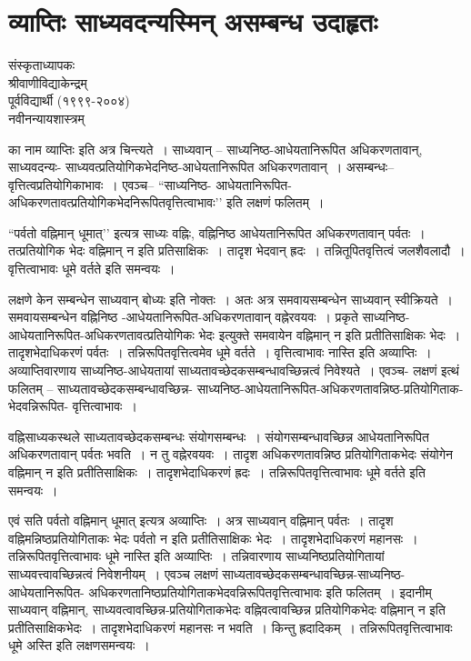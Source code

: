 {\fontsize{15}{17}\selectfont
\chapter{व्याप्तिः साध्यवदन्यस्मिन्  असम्बन्ध उदाहृतः}

\begin{center}
\smallskip

संस्कृताध्यापकः\\
श्रीवाणीविद्याकेन्द्रम्\\
पूर्वविद्यार्थी (१९९९-२००४)\\
नवीनन्यायशास्त्रम्
\addrule
\end{center}

का नाम व्याप्तिः इति अत्र चिन्त्यते~। साध्यवान् – साध्यनिष्ठ-आधेयतानिरूपित अधिकरणतावान्, साध्यवदन्यः- साध्यवत्प्रतियोगिकभेदनिष्ठ-आधेयतानिरूपित अधिकरणतावान्~। असम्बन्धः--वृत्तित्वप्रतियोगिकाभावः~। एवञ्च– “साध्यनिष्ठ- आधेयतानिरूपित-अधिकरणतावत्प्रतियोगिकभेदनिरूपितवृत्तित्वाभावः’’ इति लक्षणं फलितम्~। 

“पर्वतो वह्निमान् धूमात्’’ इत्यत्र साध्यः वह्निः, वह्निनिष्ठ आधेयतानिरूपित अधिकरणतावान् पर्वतः~। तत्प्रतियोगिक भेदः वह्निमान् न इति प्रतिसाक्षिकः~। तादृश भेदवान् ह्रदः~। तन्नितूपितवृत्तित्वं जलशैवलादौ~। वृत्तित्वाभावः धूमे वर्तते इति समन्वयः~। 

लक्षणे केन सम्बन्धेन साध्यवान् बोध्यः इति नोक्तः~। अतः अत्र समवायसम्बन्धेन साध्यवान् स्वीक्रियते~। समवायसम्बन्धेन वह्निनिष्ठ -आधेयतानिरूपित-अधिकरणतावान् वह्नेरवयवः~। प्रकृते साध्यनिष्ठ-आधेयतानिरूपित-अधिकरणतावत्प्रतियोगिकः भेदः इत्युक्ते समवायेन वह्निमान् न इति प्रतीतिसाक्षिकः भेदः~। तादृशभेदाधिकरणं पर्वतः~। तन्निरूपितवृत्तित्वमेव धूमे वर्तते~। वृत्तित्वाभावः नास्ति इति अव्याप्तिः~। अव्याप्तिवारणाय साध्यनिष्ठ-आधेयतायां साध्यतावच्छेदकसम्बन्धावच्छिन्नत्वं निवेश्यते~। एवञ्च- लक्षणं इत्थं फलितम् – साध्यतावच्छेदकसम्बन्धावच्छिन्न- साध्यनिष्ठ-आधेयतानिरूपित-अधिकरणतावन्निष्ठ-प्रतियोगिताक-भेदवन्निरूपित- वृत्तित्वाभावः~। 

वह्निसाध्यकस्थले साध्यतावच्छेदकसम्बन्धः संयोगसम्बन्धः~। संयोगसम्बन्धावच्छिन्न आधेयतानिरूपित अधिकरणतावान् पर्वतः भवति~। न तु वह्नेरवयवः~। तादृश अधिकरणतावन्निष्ठ प्रतियोगिताकभेदः संयोगेन वह्निमान् न इति प्रतीतिसाक्षिकः~। तादृशभेदाधिकरणं ह्रदः~। तन्निरूपितवृत्तित्वाभावः धूमे वर्तते इति समन्वयः~। 

एवं सति पर्वतो वह्निमान् धूमात् इत्यत्र अव्याप्तिः~। अत्र साध्यवान् वह्निमान् पर्वतः~। तादृश वह्निमन्निष्ठप्रतियोगिताकः भेदः पर्वतो न इति प्रतीतिसाक्षिकः भेदः~। तादृशभेदाधिकरणं महानसः~। तन्निरूपितवृत्तित्वाभावः धूमे नास्ति इति अव्याप्तिः~। तन्निवारणाय साध्यनिष्ठप्रतियोगितायां साध्यवत्त्वावच्छिन्नत्वं निवेशनीयम्~। एवञ्च लक्षणं साध्यतावच्छेदकसम्बन्धा\-वच्छिन्न-साध्यनिष्ठ-आधेयतानिरूपित- अधिकरणतानिष्ठप्रतियोगिताकभेदवन्निरूपितवृत्तित्वाभावः इति फलितम्~। इदानीम् साध्यवान् वह्निमान्, साध्यवत्वावच्छिन्न-प्रतियोगिताकभेदः वह्निवत्वावच्छिन्न प्रतियोगिकभेदः वह्निमान् न इति प्रतीतिसाक्षिकभेदः~। तादृशभेदाधिकरणं महानसः न भवति~। किन्तु ह्रदादिकम्~। तन्निरूपितवृत्तित्वाभावः धूमे अस्ति इति लक्षणसमन्वयः~। 

\articleend
}
